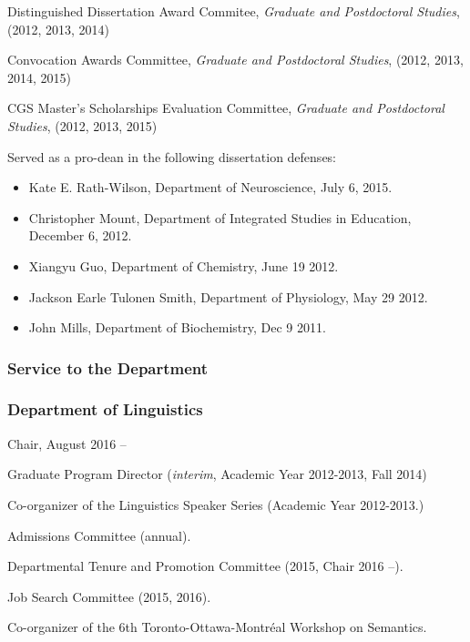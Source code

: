 \documentclass[11pt]{article}
\begin{document}
Distinguished Dissertation Award Commitee, \textit{Graduate and
  Postdoctoral Studies}, (2012, 2013, 2014)

Convocation Awards Committee, \textit{Graduate and
  Postdoctoral Studies}, (2012, 2013, 2014, 2015)

CGS Master's Scholarships Evaluation Committee, \textit{Graduate and
  Postdoctoral Studies}, (2012, 2013, 2015)

Served as a pro-dean in the following dissertation defenses:

\begin{itemize}
\item Kate E. Rath-Wilson, Department of Neuroscience, July 6, 2015.
\item Christopher Mount, Department of Integrated Studies in
  Education, December 6, 2012.
\item Xiangyu Guo, Department of Chemistry, June 19 2012.
\item Jackson Earle Tulonen Smith, Department of Physiology, May 29 2012.
\item John Mills, Department of Biochemistry, Dec 9 2011.

\end{itemize}

\subsubsection*{Service to the Department}

\subsubsection*{Department of Linguistics}

Chair, August 2016 --

Graduate Program Director (\textit{interim}, Academic Year 2012-2013, Fall 2014)


Co-organizer of the Linguistics Speaker Series (Academic Year 2012-2013.)


Admissions Committee (annual).

Departmental Tenure and Promotion Committee (2015, Chair 2016 --).

Job Search Committee (2015, 2016).

Co-organizer of the 6th Toronto-Ottawa-Montr\'eal Workshop on
Semantics.
\end{document}
